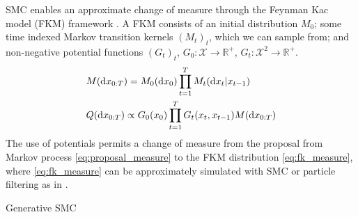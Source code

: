 SMC enables an approximate change of measure through the Feynman Kac model (FKM) framework \citep{chopin2020introduction, del2004feynman}. A FKM consists of an initial distribution $M_0$; some time indexed Markov transition kernels $(M_t)_t$, which we can sample from; and non-negative potential functions $(G_t)_t$, $G_0: \mathcal{X} \rightarrow \mathbb{R}^+$, $G_t: \mathcal{X}^2 \rightarrow \mathbb{R}^+$. 
\begin{align}
    &M(\mathrm{d}x_{0:T}) = M_0(\mathrm{d}x_0)\prod_{t=1}^{T}M_t(\mathrm{d}x_t|x_{t-1}) \label{eq:proposal_measure} \\ \vspace{-0.1cm}
    &Q(\mathrm{d}x_{0:T}) \propto G_0(x_0)\prod_{t=1}^{T}G_t(x_t,x_{t-1})M(\mathrm{d}x_{0:T}) \label{eq:fk_measure} 
\end{align}
The use of potentials permits a change of measure from the proposal from Markov process \eqref{eq:proposal_measure} to the FKM distribution \eqref{eq:fk_measure}, where \eqref{eq:fk_measure} can be approximately simulated with SMC or particle filtering as in .
{\small
\begin{algorithm}
        \caption{Generative SMC}
        \label{alg:gen_smc}
        \setlength{\parindent}{0pt}
        \begin{algorithmic}
        \EndFor
        \end{algorithmic}
        \end{algorithm}
        }






